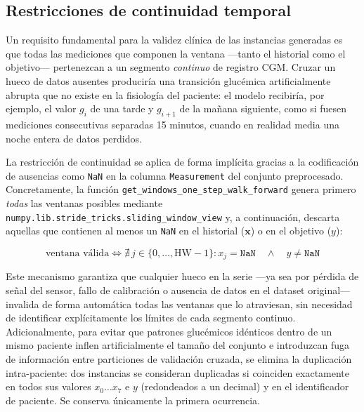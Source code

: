 \subsection{Restricciones de continuidad temporal}
\label{subsec:restricciones_continuidad}

Un requisito fundamental para la validez clínica de las instancias generadas es que todas las mediciones que componen la ventana —tanto el historial como el objetivo— pertenezcan a un segmento \emph{continuo} de registro CGM. Cruzar un hueco de datos ausentes produciría una transición glucémica artificialmente abrupta que no existe en la fisiología del paciente: el modelo recibiría, por ejemplo, el valor $g_i$ de una tarde y $g_{i+1}$ de la mañana siguiente, como si fuesen mediciones consecutivas separadas 15 minutos, cuando en realidad media una noche entera de datos perdidos.

La restricción de continuidad se aplica de forma implícita gracias a la codificación de ausencias como \texttt{NaN} en la columna \texttt{Measurement} del conjunto preprocesado. Concretamente, la función \texttt{get\_windows\_one\_step\_walk\_forward} genera primero \emph{todas} las ventanas posibles mediante \texttt{numpy.lib.stride\_tricks.sliding\_window\_view} y, a continuación, descarta aquellas que contienen al menos un \texttt{NaN} en el historial ($\mathbf{x}$) o en el objetivo ($y$):

\begin{equation}
    \text{ventana válida} \iff \nexists\, j \in \{0,\ldots,\text{HW}-1\} : x_j = \texttt{NaN}
    \quad \land \quad y \neq \texttt{NaN}
    \label{eq:validez_ventana}
\end{equation}

Este mecanismo garantiza que cualquier hueco en la serie —ya sea por pérdida de señal del sensor, fallo de calibración o ausencia de datos en el dataset original— invalida de forma automática todas las ventanas que lo atraviesan, sin necesidad de identificar explícitamente los límites de cada segmento continuo.
Adicionalmente, para evitar que patrones glucémicos idénticos dentro de un mismo paciente inflen artificialmente el tamaño del conjunto e introduzcan fuga de información entre particiones de validación cruzada, se elimina la duplicación intra-paciente: dos instancias se consideran duplicadas si coinciden exactamente en todos sus valores $x_0\ldots x_7$ e $y$ (redondeados a un decimal) y en el identificador de paciente. Se conserva únicamente la primera ocurrencia.

